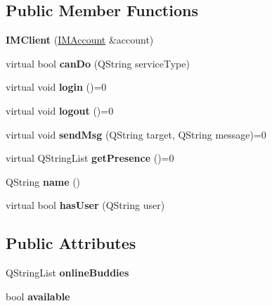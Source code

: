\subsection*{Public Member Functions}
\begin{DoxyCompactItemize}
\item 
\hypertarget{classIMClient_aee8f4aeb842ed4abb2d9622d539aa59a}{
{\bfseries IMClient} (\hyperlink{classIMAccount}{IMAccount} \&account)}
\label{classIMClient_aee8f4aeb842ed4abb2d9622d539aa59a}

\item 
\hypertarget{classIMClient_ae28370aa8886d1834f02e8a273b3113d}{
virtual bool {\bfseries canDo} (QString serviceType)}
\label{classIMClient_ae28370aa8886d1834f02e8a273b3113d}

\item 
\hypertarget{classIMClient_a7a8f24f0c4d34b7f1f0aa4b74d9a3ea1}{
virtual void {\bfseries login} ()=0}
\label{classIMClient_a7a8f24f0c4d34b7f1f0aa4b74d9a3ea1}

\item 
\hypertarget{classIMClient_a3b10fc13a5712f3eac8693f16e81683d}{
virtual void {\bfseries logout} ()=0}
\label{classIMClient_a3b10fc13a5712f3eac8693f16e81683d}

\item 
\hypertarget{classIMClient_a56f41af0d0b434c9564104aaca012331}{
virtual void {\bfseries sendMsg} (QString target, QString message)=0}
\label{classIMClient_a56f41af0d0b434c9564104aaca012331}

\item 
\hypertarget{classIMClient_a67646bbcbb2c2434f90e5624f05f75d7}{
virtual QStringList {\bfseries getPresence} ()=0}
\label{classIMClient_a67646bbcbb2c2434f90e5624f05f75d7}

\item 
\hypertarget{classIMClient_a1be30f768a0a31e1bafad4915d5f7ac9}{
QString {\bfseries name} ()}
\label{classIMClient_a1be30f768a0a31e1bafad4915d5f7ac9}

\item 
\hypertarget{classIMClient_a73a6b8019fbc05baa39af0bea299cee8}{
virtual bool {\bfseries hasUser} (QString user)}
\label{classIMClient_a73a6b8019fbc05baa39af0bea299cee8}

\end{DoxyCompactItemize}
\subsection*{Public Attributes}
\begin{DoxyCompactItemize}
\item 
\hypertarget{classIMClient_acd536379ac9deeb0b064e2577f10e1da}{
QStringList {\bfseries onlineBuddies}}
\label{classIMClient_acd536379ac9deeb0b064e2577f10e1da}

\item 
\hypertarget{classIMClient_a8bbc41e311653db1693d6a2d784aa4aa}{
bool {\bfseries available}}
\label{classIMClient_a8bbc41e311653db1693d6a2d784aa4aa}

\end{DoxyCompactItemize}
